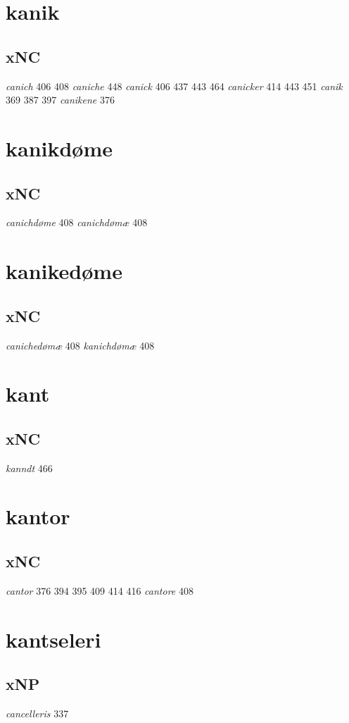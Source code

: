 \documentclass[a4paper,twocolumn]{article}
\begin{document}
\section{kanik}
\label{sec:org44b52a3}
\subsection{xNC}
\label{sec:orgac650ad}
\emph{canich} 406 408 \emph{caniche} 448 \emph{canick} 406 437 443 464 \emph{canicker} 414 443 451 \emph{canik} 369 387 397 \emph{canikene} 376 
\section{kanikdøme}
\label{sec:org02f68d9}
\subsection{xNC}
\label{sec:org4e3256f}
\emph{canichdøme} 408 \emph{canichdømæ} 408 
\section{kanikedøme}
\label{sec:org6d163f5}
\subsection{xNC}
\label{sec:orgff8d4d9}
\emph{canichedømæ} 408 \emph{kanichdømæ} 408 
\section{kant}
\label{sec:org19020cc}
\subsection{xNC}
\label{sec:org36384cb}
\emph{kanndt} 466 
\section{kantor}
\label{sec:orgb6d3d07}
\subsection{xNC}
\label{sec:org6102515}
\emph{cantor} 376 394 395 409 414 416 \emph{cantore} 408 
\section{kantseleri}
\label{sec:orgbdcd69b}
\subsection{xNP}
\label{sec:orgc9bb151}
\emph{cancelleris} 337 
\end{document}
